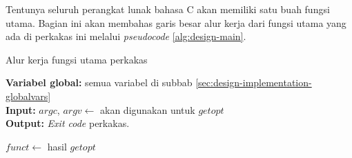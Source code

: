 Tentunya seluruh perangkat lunak bahasa C akan memiliki satu buah fungsi utama. Bagian ini akan membahas garis besar alur kerja dari fungsi utama yang ada di perkakas ini melalui \textit{pseudocode} \ref{alg:design-main}.

\begin{algorithm}[h]
	\caption{Alur kerja fungsi utama perkakas}
	\label{alg:design-main}
	\vspace{-0.6\baselineskip}
	\begin{flushleft}
		\textbf{Variabel global:} semua variabel di subbab \ref{sec:design-implementation-globalvars} \\
		\textbf{Input:} $argc$, $argv \gets$ akan digunakan untuk $getopt$ \\
		\textbf{Output:} \textit{Exit code} perkakas. \\
	\end{flushleft}
	\vspace{-1.05\baselineskip}
	\begin{algorithmic}
		 
			\State $funct \gets$ hasil $getopt$
			

\end{algorithmic}
\end{algorithm}
